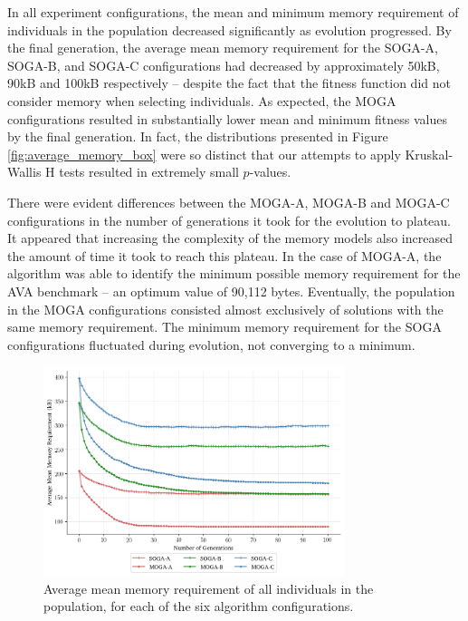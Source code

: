 \documentclass[conference]{IEEEtran}
\begin{document}
In all experiment configurations, the mean and minimum memory requirement of individuals in the population decreased significantly as evolution progressed. By the final generation, the average mean memory requirement for the SOGA-A, SOGA-B, and SOGA-C configurations had decreased by approximately 50kB, 90kB and 100kB respectively -- despite the fact that the fitness function did not consider memory when selecting individuals. As expected, the MOGA configurations resulted in substantially lower mean and minimum fitness values by the final generation. In fact, the  distributions presented in Figure \ref{fig:average_memory_box} were so distinct that our attempts to apply Kruskal-Wallis H tests resulted in extremely small $p$-values.  
	
There were evident differences between the MOGA-A, MOGA-B and MOGA-C configurations in the number of generations it took for the evolution to plateau. It appeared that increasing the complexity of the memory models also increased the amount of time it took to reach this plateau. In the case of MOGA-A, the algorithm was able to identify the minimum possible memory requirement for the AVA benchmark -- an optimum value of 90,112 bytes. Eventually, the population in the MOGA configurations consisted almost exclusively of solutions with the same memory requirement. The minimum memory requirement for the SOGA configurations fluctuated during evolution, not converging to a minimum.

\begin{figure}[!t]
  \centering
  \includegraphics*[width=8.8cm,keepaspectratio]{img/mean_memory_generations}
\vspace{-4ex}
  \caption{Average mean memory requirement of all individuals in the population, for each of the six algorithm configurations.}
  \label{fig:average_memory_generations}
\vspace{-2ex}
\end{figure}
\end{document}
